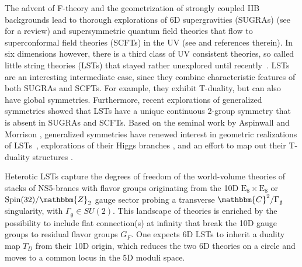 \documentclass[11pt]{article}
\numberwithin{equation}{section}
\newcommand{\fg}{\mathfrak{g}}
\begin{document}
The advent of F-theory and the geometrization of strongly coupled IIB backgrounds lead to thorough explorations of 6D supergravities (SUGRAs) \cite{Kumar:2010ru} (see \cite{Taylor:2011wt} for a review) and supersymmetric quantum field theories that flow to superconformal field theories (SCFTs) in the UV (see \cite{Heckman:2018jxk} and references therein). In six dimensions however, there is a third class of UV consistent theories, so called little string theories (LSTs) that stayed rather unexplored until recently~\cite{Sagnotti:1987tw,Bianchi:1990yu,Blum:1997mm,Intriligator:1997dh,Aspinwall:1997ye,Font:2017cya,Font:2017cmx,Bhardwaj:2015oru}. LSTs are an interesting intermediate case, since they combine characteristic features of both SUGRAs and SCFTs. For example, they exhibit T-duality, but can also have global symmetries. Furthermore, recent explorations of generalized symmetries \cite{Gaiotto:2014kfa} showed that LSTs have a unique continuous 2-group symmetry \cite{Cordova:2018cvg,Cordova:2020tij,DelZotto:2020sop,Apruzzi:2021mlh} that is absent in SUGRAs and SCFTs. 
Based on the seminal work by Aspinwall and Morrison \cite{Aspinwall:1996vc}, generalized symmetries have renewed interest in geometric realizations of LSTs~\cite{Font:2016odl,Font:2017cya,DelZotto:2022xrh,DelZotto:2023ahf}, explorations of their Higgs branches \cite{DelZotto:2023myd,DelZotto:2023nrb}, and an effort to map out their T-duality structures \cite{DelZotto:2022ohj,DelZotto:2022xrh}. 

Heterotic LSTs capture the degrees of freedom of the world-volume theories of stacks of NS5-branes with flavor groups originating from the 10D $\text{E}_8\times \text{E}_8$ or $\text{Spin}(32)/\mathbbm{Z}_2$ gauge sector probing a transverse $\mathbbm{C}^2/\Gamma_{\fg}$ singularity, with $\Gamma_{\fg} \in SU(2)$. This landscape of theories is enriched by the possibility to include flat connection(s) at infinity that break the 10D gauge groups to residual flavor groups $G_F$. One expects 6D LSTs to inherit a duality map $T_D$ from their 10D origin, which reduces the two 6D theories on a circle and moves to a common locus in the 5D moduli space. 
\end{document}
